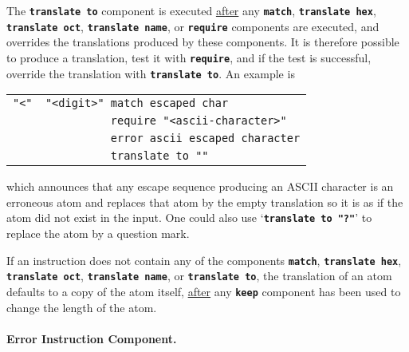 \documentclass[12pt]{article}
\newcommand{\subsubsubsection}[1]{\paragraph[#1]{#1.}}
\newcommand{\TT}[1]{{\tt \bfseries #1}}
\begin{document}
The \TT{translate to} component is executed \underline{after}
any \TT{match}, \TT{translate hex}, \TT{tran\-slate oct},
\TT{translate name}, or
\TT{require} components are executed, and overrides the translations produced
by these components.  It is therefore possible to produce a translation,
test it with \TT{require}, and if the test is successful, override the
translation with \TT{translate to}.  An example is
\begin{center}
\begin{tabular}{l}
\verb|"<"  "<digit>" match escaped char| \\
\verb|               require "<ascii-character>"| \\
\verb|               error ascii escaped character| \\
\verb|               translate to ""| \\
\end{tabular}
\end{center}
which announces that any escape sequence producing an ASCII character
is an erroneous atom and replaces that atom by the empty translation
so it is as if the atom did not exist in the input.
One could also use `\TT{translate to "?"}' to replace the atom
by a question mark.

If an instruction does not contain any of the components \TT{match},
\TT{translate hex}, \TT{tran\-s\-late oct},
\TT{trans\-late name}, or \TT{trans\-late to},
the translation
of an atom defaults to a copy of the atom itself, \underline{after}
any \TT{keep} component has been used to change the length of the atom.

\subsubsubsection{Error Instruction Component}
\end{document}
